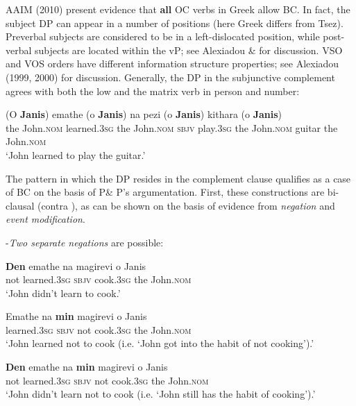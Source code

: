 \documentclass[output=paper]{langsci/langscibook}
\begin{document}
AAIM (2010) present evidence that \textbf{all} OC verbs in Greek allow BC. In fact, the subject DP can appear in a number of positions (here Greek differs from Tsez). Preverbal subjects are considered to be in a left-dislocated position, while post-verbal subjects are located within the vP; see Alexiadou \& \citet{Anagnostopoulou1998} for discussion. VSO and VOS orders have different information structure properties; see Alexiadou (1999, 2000) for discussion.  Generally, the DP in the subjunctive complement agrees with both the low and the matrix verb in person and number:



\ea%
    \label{ex:alexiadou:6}
    \gll (O \textbf{Janis}) emathe (o \textbf{Janis}) na pezi  (o \textbf{Janis}) kithara (o \textbf{Janis})\\
         the John.\textsc{nom} learned.\textsc{3sg} the John.\textsc{nom sbjv} play.\textsc{3sg} the John.\textsc{nom} guitar the John.\textsc{nom}\\
    \glt    ‘John learned to play the guitar.’
    \z

The pattern in which the DP resides in the complement clause qualifies as a case of BC on the basis of P\& P’s argumentation. First, these constructions are bi-clausal (contra \citealt{Roussou2009}), as can be shown on the basis of evidence from \textit{negation} and \textit{event modification}.

-\textit{Two separate negations} are possible:



\ea%
    \label{ex:alexiadou:7}
\ea
\gll    \textbf{Den}  emathe    na    magirevi   o    Janis\\
    not   learned.\textsc{3sg  sbjv}  cook.\textsc{3sg}    the    John.\textsc{nom}\\
\glt    ‘John didn’t learn to cook.’

\ex
\gll    Emathe     na   \textbf{min}   magirevi    o    Janis\\
    learned.\textsc{3sg}  \textsc{sbjv} not  cook.\textsc{3sg} the   John.\textsc{nom}\\
\glt ‘John learned not to cook (i.e. ‘John got into the habit of not cooking’).’

\ex
\gll    \textbf{Den}   emathe    na   \textbf{min} magirevi    o    Janis\\
    not  learned.\textsc{3sg}  \textsc{sbjv} not  cook.\textsc{3sg}    the   John.\textsc{nom}\\
\glt    ‘John didn’t learn not to cook (i.e. ‘John still has the habit of cooking’).’
\z
\z
\end{document}

